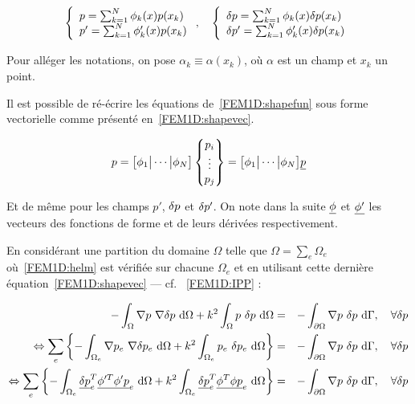 \begin{equation}
	\left\{\begin{array}{l}
		p = \sum_{k=1}^N \phi_k(x)p(x_k)\\
		p' = \sum_{k=1}^N \phi_k'(x)p(x_k)\\
	\end{array}\right., \quad
	\left\{\begin{array}{l}
		\delta p = \sum_{k=1}^N \phi_k(x)\delta p(x_k)\\
		\delta p' = \sum_{k=1}^N \phi_k'(x)\delta p(x_k)\\
	\end{array}\right.\label{FEM1D:shapefun}
\end{equation}

Pour alléger les notations, on pose $\alpha_k\equiv \alpha(x_k)$, où $\alpha$ est un champ et $x_k$ un point.

Il est possible de ré-écrire les équations de~\eqref{FEM1D:shapefun} sous forme vectorielle comme présenté
en~\eqref{FEM1D:shapevec}.

\begin{equation}
        p = \big[\phi_1\big|\cdots\big|\phi_N\big]\begin{Bmatrix}p_i\\\vdots\\p_j\end{Bmatrix} =
			\big[\phi_1\big|\cdots\big|\phi_N\big]\underline{p}\label{FEM1D:shapevec}
\end{equation}

Et de même pour les champs $p'$, $\delta p$ et $\delta p'$. On note dans la suite $\underline{\phi}$ et $\underline{\phi'}$ les vecteurs des fonctions de
forme et de leurs dérivées respectivement.

\pagebreak

En considérant une partition du domaine $\Omega$ telle que $\Omega = \sum_e\Omega_e$ où~\eqref{FEM1D:helm} est vérifiée
sur chacune $\Omega_e$ et en utilisant cette dernière équation~\eqref{FEM1D:shapevec} --- cf. ~\eqref{FEM1D:IPP} :

\begin{eqnarray*}
	- \int_\Omega \nabla p~\nabla \delta p ~\mathrm{d}\Omega + k^2\int_\Omega p~\delta p~\mathrm{d}\Omega & = & -\int_{\partial\Omega}\nabla p~\delta p~\mathrm{d}\Gamma, \quad \forall\delta p\\
\Leftrightarrow \sum_e\left\{- \int_{\Omega_e} \nabla p_e~\nabla \delta p_e ~\mathrm{d}\Omega + k^2\int_{\Omega_e} p_e~\delta p_e~\mathrm{d}\Omega \right\}& = & -\int_{\partial\Omega}\nabla p~\delta p~\mathrm{d}\Gamma, \quad \forall\delta p\\
	\Leftrightarrow \sum_e\left\{- \int_{\Omega_e} \underline{\delta p}_e^T\underline{\phi'^T\phi'}\underline{p}_e~\mathrm{d}\Omega + k^2\int_{\Omega_e} \underline{\delta p}_e^T\underline{\phi^T\phi}\underline{p}_e~\mathrm{d}\Omega \right\}& = & -\int_{\partial\Omega}\nabla p~\delta p~\mathrm{d}\Gamma, \quad \forall\delta p\\
\end{eqnarray*}


